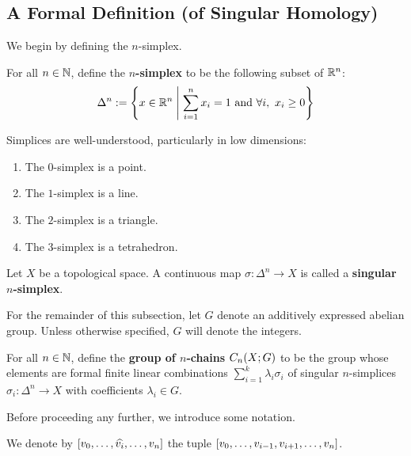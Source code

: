 \subsection{A Formal Definition (of Singular Homology)}

We begin by defining the $n$-simplex.

\begin{boxdefinition}[$n$-Simplex]
    For all $n \in \mathbb{N}$, define the \textbf{$n$-simplex} to be the following subset of $\mathbb{R}^n$:
    \begin{align*}
        \Delta^n := \left\{ x \in \mathbb{R}^{n} \; \middle\vert \; \sum_{i=1}^{n} x_i = 1 \text{ and } \forall i, \ x_i \geq 0 \right\}
    \end{align*}
\end{boxdefinition}

Simplices are well-understood, particularly in low dimensions:
\begin{enumerate}
    \item The $0$-simplex is a point.
    \item The $1$-simplex is a line.
    \item The $2$-simplex is a triangle.
    \item The $3$-simplex is a tetrahedron.
\end{enumerate}

\begin{boxdefinition}
    Let $X$ be a topological space. A continuous map $\sigma : \Delta^n \to X$ is called a \textbf{singular $n$-simplex}.
\end{boxdefinition}

For the remainder of this subsection, let $G$ denote an additively expressed abelian group. Unless otherwise specified, $G$ will denote the integers.

\begin{boxdefinition}
    For all $n \in \mathbb{N}$, define the \textbf{group of $n$-chains $C_n\!\left( X; G \right)$} to be the group whose elements are formal finite linear combinations $\sum_{i=1}^{k} \lambda_i \sigma_i$ of singular $n$-simplices $\sigma_i : \Delta^n \to X$ with coefficients $\lambda_i \in G$.
\end{boxdefinition}

Before proceeding any further, we introduce some notation.

\begin{boxnotation}
    We denote by $\left[ v_0, \ldots, \widehat{v_i}, \ldots, v_n \right]$ the tuple $\left[ v_0, \ldots, v_{i-1}, v_{i+1}, \ldots, v_n \right]$.
\end{boxnotation}

